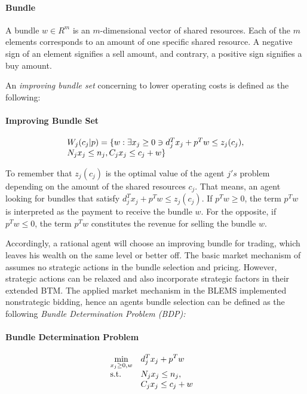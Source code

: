 \paragraph*{Bundle} A bundle $w \in R^{m}$ is an $m$-dimensional vector of shared resources. 
Each of the $m$ elements corresponds to an amount of one specific shared resource. 
A negative sign of an element signifies a sell amount, 
and contrary, a positive sign signifies a buy amount. \newline


An \textit{improving bundle set} concerning to lower operating costs is defined as the following:

\paragraph*{Improving Bundle Set}
\begin{equation}
 \begin{array}{ll@{}ll}
 W_{j}(c_{j}|p) = \{w: \exists x_{j} \geq 0 \ni d_{j}^{T}x_{j} + p^{T}w \leq z_{j}(c_{j}), \\
 N_{j}x_{j} \leq n_{j}, C_{j}x_{j} \leq c_{j}+w \}
 \end{array}
\end{equation}

To remember that $z_{j}(c_{j})$ is the optimal value of the agent $j's$ problem depending on the amount of the shared resources $c_{j}$. 
That means, an agent looking for bundles that satisfy 
$d_{j}^{T}x_{j} + p^{T}w \leq z_{j}(c_{j})$. If 
$p^{T}w \geq 0$, the term $p^{T}w$ is interpreted as the payment to receive the bundle $w$.
For the opposite, if $p^{T}w \leq 0$, the term $p^{T}w$ constitutes the revenue for selling the bundle $w$.


Accordingly, a rational agent will choose an improving bundle for trading, 
which leaves his wealth on the same level or better off. 
The basic market mechanism of  assumes no 
strategic actions in the bundle selection and pricing. However, strategic actions 
can be relaxed and  also incorporate strategic factors
in their extended BTM. 
The applied market mechanism in the BLEMS implemented nonstrategic bidding, hence an agents bundle selection 
can be defined as the following \textit{Bundle Determination Problem (BDP):}

\paragraph*{Bundle Determination Problem}
\begin{equation}
 \begin{array}{ll@{}ll}
 \underset{x_{j} \geq 0, w}{\text{min}} & \displaystyle d^{T}_{j}x_{j} + p^{T}w &\\
 \text{s.t.}& \displaystyle N_{j}x_{j} \leq n_{j}, &&\\
 & \displaystyle C_{j}x_{j} \leq c_{j}+w
 \end{array}
\end{equation}

